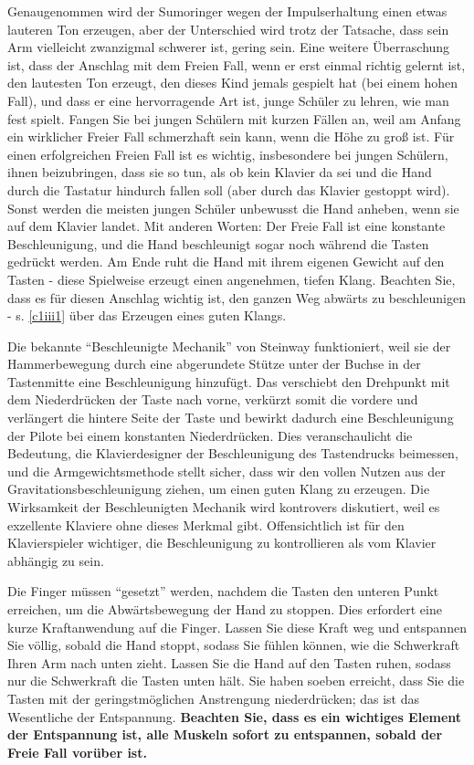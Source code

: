 Genaugenommen wird der Sumoringer wegen der Impulserhaltung einen etwas lauteren Ton erzeugen, aber der Unterschied wird trotz der Tatsache, dass sein Arm vielleicht zwanzigmal schwerer ist, gering sein.
Eine weitere Überraschung ist, dass der Anschlag mit dem Freien Fall, wenn er erst einmal richtig gelernt ist, den lautesten Ton erzeugt, den dieses Kind jemals gespielt hat (bei einem hohen Fall), und dass er eine hervorragende Art ist, junge Schüler zu lehren, wie man fest spielt.
Fangen Sie bei jungen Schülern mit kurzen Fällen an, weil am Anfang ein wirklicher Freier Fall schmerzhaft sein kann, wenn die Höhe zu groß ist.
Für einen erfolgreichen Freien Fall ist es wichtig, insbesondere bei jungen Schülern, ihnen beizubringen, dass sie so tun, als ob kein Klavier da sei und die Hand durch die Tastatur hindurch fallen soll (aber durch das Klavier gestoppt wird).
Sonst werden die meisten jungen Schüler unbewusst die Hand anheben, wenn sie auf dem Klavier landet.
Mit anderen Worten: Der Freie Fall ist eine konstante Beschleunigung, und die Hand beschleunigt sogar noch während die Tasten gedrückt werden.
Am Ende ruht die Hand mit ihrem eigenen Gewicht auf den Tasten - diese Spielweise erzeugt einen angenehmen, tiefen Klang.
Beachten Sie, dass es für diesen Anschlag wichtig ist, den ganzen Weg abwärts zu beschleunigen - s. \hyperref[c1iii1]{\autoref{c1iii1}} über das Erzeugen eines guten Klangs.

Die bekannte \enquote{Beschleunigte Mechanik} von Steinway funktioniert, weil sie der Hammerbewegung durch eine abgerundete Stütze unter der Buchse in der Tastenmitte eine Beschleunigung hinzufügt.
Das verschiebt den Drehpunkt mit dem Niederdrücken der Taste nach vorne, verkürzt somit die vordere und verlängert die hintere Seite der Taste und bewirkt dadurch eine Beschleunigung der Pilote bei einem konstanten Niederdrücken.
Dies veranschaulicht die Bedeutung, die Klavierdesigner der Beschleunigung des Tastendrucks beimessen, und die Armgewichtsmethode stellt sicher, dass wir den vollen Nutzen aus der Gravitationsbeschleunigung ziehen, um einen guten Klang zu erzeugen.
Die Wirksamkeit der Beschleunigten Mechanik wird kontrovers diskutiert, weil es exzellente Klaviere ohne dieses Merkmal gibt.
Offensichtlich ist für den Klavierspieler wichtiger, die Beschleunigung zu kontrollieren als vom Klavier abhängig zu sein.

Die Finger müssen \enquote{gesetzt} werden, nachdem die Tasten den unteren Punkt erreichen, um die Abwärtsbewegung der Hand zu stoppen.
Dies erfordert eine kurze Kraftanwendung auf die Finger.
Lassen Sie diese Kraft weg und entspannen Sie völlig, sobald die Hand stoppt, sodass Sie fühlen können, wie die Schwerkraft Ihren Arm nach unten zieht.
Lassen Sie die Hand auf den Tasten ruhen, sodass nur die Schwerkraft die Tasten unten hält.
Sie haben soeben erreicht, dass Sie die Tasten mit der geringstmöglichen Anstrengung niederdrücken; das ist das Wesentliche der Entspannung.
\textbf{Beachten Sie, dass es ein wichtiges Element der Entspannung ist, alle Muskeln sofort zu entspannen, sobald der Freie Fall vorüber ist.}

